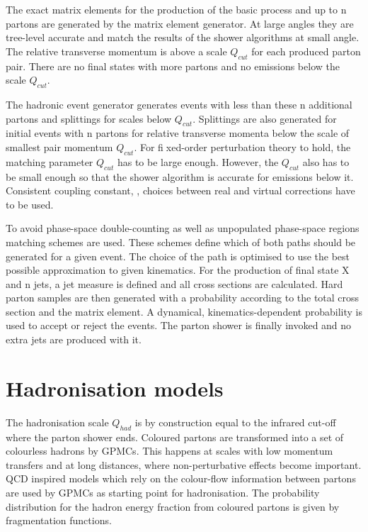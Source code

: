 The exact matrix elements for the production of the basic process and up to n partons are generated by the matrix element generator. At large angles they are tree-level accurate and match the results of the shower algorithms at small angle. The relative transverse momentum is above a scale $Q_{cut}$ for each produced parton pair. There are no final states with more partons and no emissions below the scale $Q_{cut}$.

The hadronic event generator generates events with less than these n additional partons and splittings for scales below $Q_{cut}$. Splittings are also generated for initial events with n partons for relative transverse momenta below the scale of smallest pair momentum $Q_{cut}$. For fixed-order perturbation theory to hold, the matching parameter $Q_{cut}$ has to be large enough. However, the $Q_{cut}$ also has to be small enough so that the shower algorithm is accurate for emissions below it. Consistent coupling constant, \as, choices between real and virtual corrections have to be used.

To avoid phase-space double-counting as well as unpopulated phase-space regions matching schemes \cite{Hoche:2006ph} are used. These schemes define which of both paths should be generated for a given event. The choice of the path is optimised to use the best possible approximation to given kinematics. For the production of final state X and n jets, a jet measure is defined and all cross sections are calculated. Hard parton samples are then generated with a probability according to the total cross section and the matrix element. A dynamical, kinematics-dependent probability is used to accept or reject the events. The parton shower is finally invoked and no extra jets are produced with it.


\section{Hadronisation models}

The hadronisation scale $Q_{had}$ is by construction equal to the infrared cut-off where the parton shower ends. Coloured partons are transformed into a set of colourless hadrons by GPMCs. This happens at scales with low momentum transfers and at long distances, where non-perturbative effects become important. QCD inspired models which rely on the colour-flow information between partons are used by GPMCs as starting point for hadronisation. The probability distribution for the hadron energy fraction from coloured partons is given by fragmentation functions.

